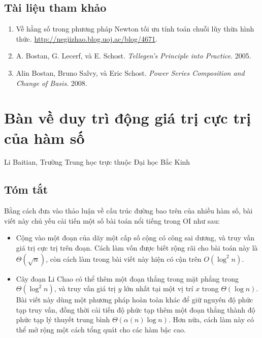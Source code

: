 \documentclass[11pt]{article}
\begin{document}
\subsection*{Tài liệu tham khảo}

\begin{enumerate}
  \item Về hằng số trong phương pháp Newton tối ưu tính toán chuỗi lũy thừa
  hình thức. \url{http://negiizhao.blog.uoj.ac/blog/4671}.
  \item A. Bostan, G. Lecerf, và E. Schost. \emph{Tellegen's Principle into
  Practice}. 2005.
  \item Alin Bostan, Bruno Salvy, và Eric Schost. \emph{Power Series
  Composition and Change of Basis}. 2008.
\end{enumerate}

\section{Bàn về duy trì động giá trị cực trị của hàm số}

\begin{center}
Li Baitian, Trường Trung học trực thuộc Đại học Bắc Kinh
\end{center}

\subsection*{Tóm tắt}

Bằng cách đưa vào thảo luận về cấu trúc đường bao trên của nhiều hàm số, bài
viết này chủ yếu cải tiến một số bài toán nổi tiếng trong OI như sau:

\begin{itemize}
  \item Cộng vào một đoạn của dãy một cấp số cộng có công sai dương, và truy vấn
  giá trị cực trị trên đoạn. Cách làm vốn được biết rộng rãi cho bài toán này là
  \(\Theta(\sqrt n)\), còn cách làm trong bài viết này hiện có cận trên
  \(O(\log^2 n)\).
  \item Cây đoạn Li Chao có thể thêm một đoạn thẳng trong mặt phẳng trong
  \(\Theta(\log^2 n)\), và truy vấn giá trị \(y\) lớn nhất tại một vị trí \(x\)
  trong \(\Theta(\log n)\). Bài viết này dùng một phương pháp hoàn toàn khác để
  giữ nguyên độ phức tạp truy vấn, đồng thời cải tiến độ phức tạp thêm một đoạn
  thẳng thành độ phức tạp lý thuyết trung bình \(\Theta(\alpha(n)\log n)\). Hơn
  nữa, cách làm này có thể mở rộng một cách tổng quát cho các hàm bậc cao.
\end{itemize}
\end{document}
